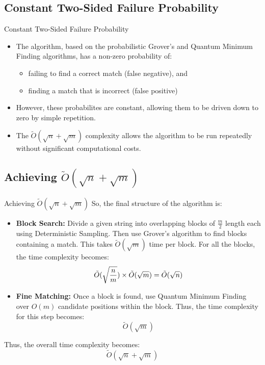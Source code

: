 \documentclass{beamer}
\begin{document}
\subsection{Constant Two-Sided Failure Probability}
\begin{frame}{Constant Two-Sided Failure Probability}
  \begin{itemize}
    \item The algorithm, based on the probabilistic Grover's and Quantum Minimum Finding algorithms, has a non-zero probability of:
          \begin{itemize}
            \item failing to find a correct match (false negative), and
            \item finding a match that is incorrect (false positive)
          \end{itemize}

    \item However, these probabilites are constant, allowing them to be driven down to zero by simple repetition.
    \item The $\tilde{O} (\sqrt{n} + \sqrt{m})$ complexity allows the algorithm to be run repeatedly without significant computational costs.
  \end{itemize}
\end{frame}

\subsection{Achieving \texorpdfstring{$\tilde{O}(\sqrt{n} + \sqrt{m})$}{O(sqrt(n)+sqrt(m))}}
\begin{frame}{Achieving \texorpdfstring{$\tilde{O}(\sqrt{n} + \sqrt{m})$}{O(sqrt(n)+sqrt(m))}}
  So, the final structure of the algorithm is:
  \begin{itemize}
    \item \textbf{Block Search: }Divide a given string into overlapping blocks of $\frac{m}{2}$ length each using Deterministic Sampling. Then use Grover's algorithm to find blocks containing a match. This takes $\tilde{O}(\sqrt{m})$ time per block. For all the blocks, the time complexity becomes:
          \[
            \tilde{O} ( \sqrt{n \over m} ) \times \tilde{O}(\sqrt{m}) = \tilde{O}(\sqrt{n})
          \]
    \item \textbf{Fine Matching: }Once a block is found, use Quantum Minimum Finding over $O(m)$ candidate positions within the block. Thus, the time complexity for this step becomes:
          \[
            \tilde{O}(\sqrt{m})
          \]
  \end{itemize}
  Thus, the overall time complexity becomes:
  \[
    \tilde{O}(\sqrt{n}+\sqrt{m})
  \]

\end{frame}
\end{document}

